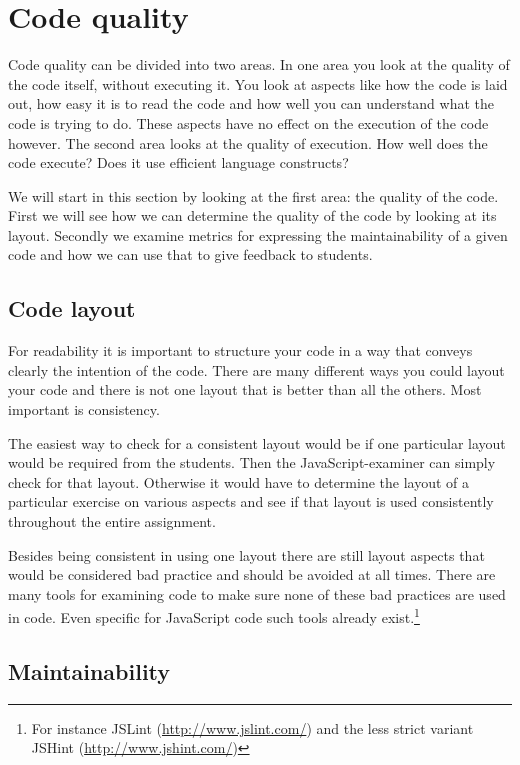 \section{Code quality}

Code quality can be divided into two areas. In one area you look at the quality
of the code itself, without executing it. You look at aspects like how the code
is laid out, how easy it is to read the code and how well you can understand
what the code is trying to do. These aspects have no effect on the execution of
the code however. The second area looks at the quality of execution. How well
does the code execute? Does it use efficient language constructs?

We will start in this section by looking at the first area: the quality of the
code. First we will see how we can determine the quality of the code by looking
at its layout. Secondly we examine metrics for expressing the maintainability
of a given code and how we can use that to give feedback to students.

\subsection{Code layout}

For readability it is important to structure your code in a way that conveys clearly the intention of the code. There are many different ways you could layout your code and there is not one layout that is better than all the others. Most important is consistency.

The easiest way to check for a consistent layout would be if one particular layout would be required from the students. Then the JavaScript-examiner can simply check for that layout. Otherwise it would have to determine the layout of a particular exercise on various aspects and see if that layout is used consistently throughout the entire assignment.

Besides being consistent in using one layout there are still layout aspects
that would be considered bad practice and should be avoided at all times. There
are many tools for examining code to make sure none of these bad practices are
used in code. Even specific for JavaScript code such tools already
exist.\footnote{For instance JSLint (\url{http://www.jslint.com/}) and the less
strict variant JSHint (\url{http://www.jshint.com/})}

\subsection{Maintainability}

